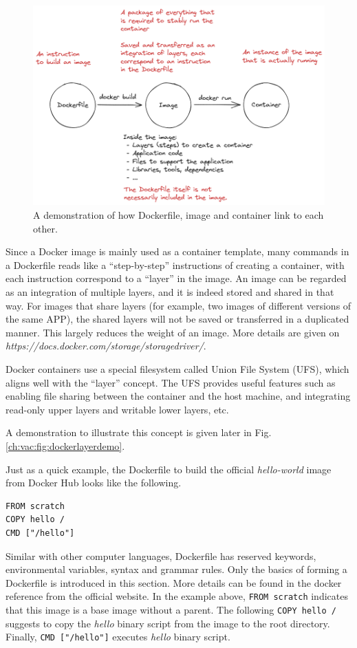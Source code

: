 \begin{figure}
	\centering
	\includegraphics[width=350pt]{chapters/ch-virtualization-and-containerization/figures/dockerfiletoimage.png}
	\caption{A demonstration of how Dockerfile, image and container link to each other.} \label{ch:vac:fig:dockerfiletoimage}
\end{figure}

Since a Docker image is mainly used as a container template, many commands in a Dockerfile reads like a ``step-by-step'' instructions of creating a container, with each instruction correspond to a ``layer'' in the image. An image can be regarded as an integration of multiple layers, and it is indeed stored and shared in that way. For images that share layers (for example, two images of different versions of the same APP), the shared layers will not be saved or transferred in a duplicated manner. This largely reduces the weight of an image. More details are given on \textit{https://docs.docker.com/storage/storagedriver/}.

Docker containers use a special filesystem called Union File System (UFS), which aligns well with the ``layer'' concept. The UFS provides useful features such as enabling file sharing between the container and the host machine, and integrating read-only upper layers and writable lower layers, etc.

A demonstration to illustrate this concept is given later in Fig. \ref{ch:vac:fig:dockerlayerdemo}.


Just as a quick example, the Dockerfile to build the official \textit{hello-world} image from Docker Hub looks like the following.
\begin{lstlisting}
FROM scratch
COPY hello /
CMD ["/hello"]
\end{lstlisting}
Similar with other computer languages, Dockerfile has reserved keywords, environmental variables, syntax and grammar rules. Only the basics of forming a Dockerfile is introduced in this section. More details can be found in the docker reference from the official website. In the example above, \verb|FROM scratch| indicates that this image is a base image without a parent. The following \verb|COPY hello /| suggests to copy the \textit{hello} binary script from the image to the root directory. Finally, \verb|CMD ["/hello"]| executes \textit{hello} binary script.

